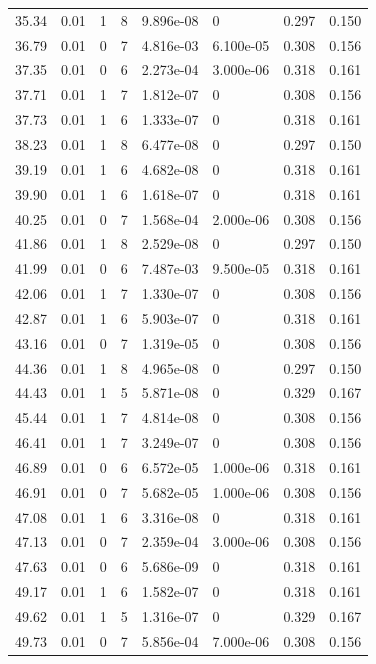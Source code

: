 \documentclass[preview]{standalone}
\begin{document}
{{{\begin{tabular}{L{1.2cm}C{1.2cm} C{0.3cm}C{0.5cm} C{1.4cm}C{1.4cm} C{1.4cm}C{1.4cm}}
  35.34  &  0.01  & 1     &  8 &  9.896e-08  & 0  & 0.297 &  0.150   \\ 
  36.79  &  0.01  & 0     &  7 &  4.816e-03  & 6.100e-05  & 0.308 &  0.156   \\ 
  37.35  &  0.01  & 0     &  6 &  2.273e-04  & 3.000e-06  & 0.318 &  0.161   \\ 
  37.71  &  0.01  & 1     &  7 &  1.812e-07  & 0  & 0.308 &  0.156   \\ 
  37.73  &  0.01  & 1     &  6 &  1.333e-07  & 0  & 0.318 &  0.161   \\ 
  38.23  &  0.01  & 1     &  8 &  6.477e-08  & 0  & 0.297 &  0.150   \\ 
  39.19  &  0.01  & 1     &  6 &  4.682e-08  & 0  & 0.318 &  0.161   \\ 
  39.90  &  0.01  & 1     &  6 &  1.618e-07  & 0  & 0.318 &  0.161   \\ 
  40.25  &  0.01  & 0     &  7 &  1.568e-04  & 2.000e-06  & 0.308 &  0.156   \\ 
  41.86  &  0.01  & 1     &  8 &  2.529e-08  & 0  & 0.297 &  0.150   \\ 
  41.99  &  0.01  & 0     &  6 &  7.487e-03  & 9.500e-05  & 0.318 &  0.161   \\ 
  42.06  &  0.01  & 1     &  7 &  1.330e-07  & 0  & 0.308 &  0.156   \\ 
  42.87  &  0.01  & 1     &  6 &  5.903e-07  & 0  & 0.318 &  0.161   \\ 
  43.16  &  0.01  & 0     &  7 &  1.319e-05  & 0  & 0.308 &  0.156   \\ 
  44.36  &  0.01  & 1     &  8 &  4.965e-08  & 0  & 0.297 &  0.150   \\ 
  44.43  &  0.01  & 1     &  5 &  5.871e-08  & 0  & 0.329 &  0.167   \\ 
  45.44  &  0.01  & 1     &  7 &  4.814e-08  & 0  & 0.308 &  0.156   \\ 
  46.41  &  0.01  & 1     &  7 &  3.249e-07  & 0  & 0.308 &  0.156   \\ 
  46.89  &  0.01  & 0     &  6 &  6.572e-05  & 1.000e-06  & 0.318 &  0.161   \\ 
  46.91  &  0.01  & 0     &  7 &  5.682e-05  & 1.000e-06  & 0.308 &  0.156   \\ 
  47.08  &  0.01  & 1     &  6 &  3.316e-08  & 0  & 0.318 &  0.161   \\ 
  47.13  &  0.01  & 0     &  7 &  2.359e-04  & 3.000e-06  & 0.308 &  0.156   \\ 
  47.63  &  0.01  & 0     &  6 &  5.686e-09  & 0  & 0.318 &  0.161   \\ 
  49.17  &  0.01  & 1     &  6 &  1.582e-07  & 0  & 0.318 &  0.161   \\ 
  49.62  &  0.01  & 1     &  5 &  1.316e-07  & 0  & 0.329 &  0.167   \\ 
  49.73  &  0.01  & 0     &  7 &  5.856e-04  & 7.000e-06  & 0.308 &  0.156   \\ 
\hline 
\end{tabular} 

}}}
\end{document}

